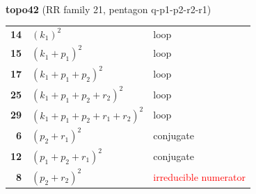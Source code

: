 \documentclass[10pt]{article}
\begin{document}
\begin{minipage}[t]{0.48\textwidth}
{}\\[2mm]\textbf{topo42} (RR family 21, pentagon q-p1-p2-r2-r1)\\[2pt]{\footnotesize\begin{tabular}{@{}r@{\ \ }l@{\ \ }l@{}}\textbf{14} & $(k_1)^2$ & loop\\
\textbf{15} & $(k_1+p_1)^2$ & loop\\
\textbf{17} & $(k_1+p_1+p_2)^2$ & loop\\
\textbf{25} & $(k_1+p_1+p_2+r_2)^2$ & loop\\
\textbf{29} & $(k_1+p_1+p_2+r_1+r_2)^2$ & loop\\
\textbf{6} & $(p_2+r_1)^2$ & conjugate\\
\textbf{12} & $(p_1+p_2+r_1)^2$ & conjugate\\
\textbf{8} & $(p_2+r_2)^2$ & \textcolor{red}{irreducible numerator}\\\end{tabular}}\end{minipage}

\bigskip
\end{document}
